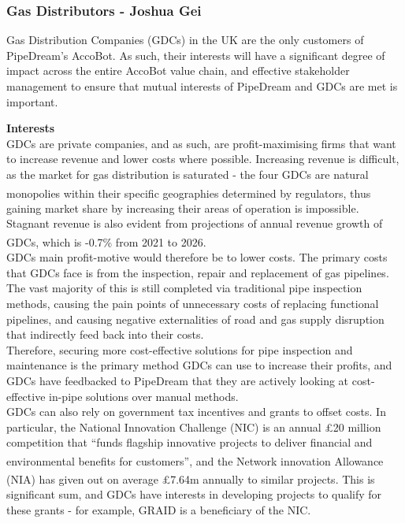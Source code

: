 \documentclass[11pt]{article}		%
\newcommand{\supercite}[1]{\textsuperscript{\cite{#1}}}		%
\begin{document}
		\subsubsection[Gas Distributors]{Gas Distributors - Joshua Gei} \label{GDCstakeholders}
	
		Gas Distribution Companies (GDCs) in the UK are the only customers of PipeDream’s AccoBot. As such, their interests will have a significant degree of impact across the entire AccoBot value chain, and effective stakeholder management to ensure that mutual interests of PipeDream and GDCs are met is important. 
	
	    \textbf{Interests}
	    \\
	    GDCs are private companies, and as such, are profit-maximising firms that want to increase revenue and lower costs where possible. Increasing revenue is difficult, as the market for gas distribution is saturated - the four GDCs are natural monopolies within their specific geographies determined by regulators\supercite{sönnichsen_5_2021}, thus gaining market share by increasing their areas of operation is impossible. Stagnant revenue is also evident from projections of annual revenue growth of GDCs, which is -0.7\% from 2021 to 2026\supercite{Gas_Distribution_Industry}.
        \\ 
        \hspace*{2ex}GDCs main profit-motive would therefore be to lower costs. The primary costs that GDCs face is from the inspection, repair and replacement of gas pipelines. The vast majority of this is still completed via traditional pipe inspection methods, causing the pain points of unnecessary costs of replacing functional pipelines, and causing negative externalities of road and gas supply disruption that indirectly feed back into their costs. 
        \\ 
        \hspace*{2ex}Therefore, securing more cost-effective solutions for pipe inspection and maintenance is the primary method GDCs can use to increase their profits, and GDCs have feedbacked to PipeDream that they are actively looking at cost-effective in-pipe solutions over manual methods. 
        \\ 
        \hspace*{2ex}GDCs can also rely on government tax incentives and grants to offset costs. In particular, the National Innovation Challenge (NIC) is an annual £20 million competition that “funds flagship innovative projects to deliver financial and environmental benefits for customers”\supercite{NIC}, and the Network innovation Allowance (NIA) has given out on average £7.64m annually to similar projects\supercite{NIA}. This is significant sum, and GDCs have interests in developing projects to qualify for these grants - for example, GRAID is a beneficiary of the NIC.  
        
\end{document}
